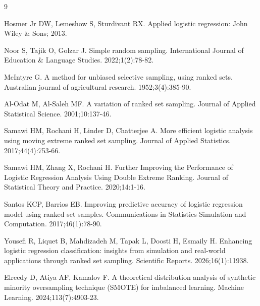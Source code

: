 \documentclass[twoside]{article}
\begin{document}
\begin{thebibliography}{9}

 Hosmer Jr DW, Lemeshow S, Sturdivant RX. Applied logistic regression: John Wiley \& Sons; 2013.

 Noor S, Tajik O, Golzar J. Simple random sampling. International Journal of Education \& Language Studies. 2022;1(2):78-82.

 McIntyre G. A method for unbiased selective sampling, using ranked sets. Australian journal of agricultural research. 1952;3(4):385-90.

 Al-Odat M, Al-Saleh MF. A variation of ranked set sampling. Journal of Applied Statistical Science. 2001;10:137-46.

 Samawi HM, Rochani H, Linder D, Chatterjee A. More efficient logistic analysis using moving extreme ranked set sampling. Journal of Applied Statistics. 2017;44(4):753-66.

 Samawi HM, Zhang X, Rochani H. Further Improving the Performance of Logistic Regression Analysis Using Double Extreme Ranking. Journal of Statistical Theory and Practice. 2020;14:1-16.

 Santos KCP, Barrios EB. Improving predictive accuracy of logistic regression model using ranked set samples. Communications in Statistics-Simulation and Computation. 2017;46(1):78-90.

 Yousefi R, Liquet B, Mahdizadeh M, Tapak L, Doosti H, Esmaily H. Enhancing logistic regression classification: insights from simulation and real-world applications through ranked set sampling. Scientific Reports. 2026;16(1):11938.

 Elreedy D, Atiya AF, Kamalov F. A theoretical distribution analysis of synthetic minority oversampling technique (SMOTE) for imbalanced learning. Machine Learning. 2024;113(7):4903-23.
\end{thebibliography}
 
\end{document}
